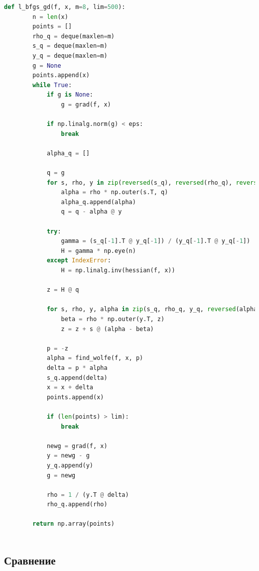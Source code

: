 \documentclass[a4paper,14pt,oneside,openany]{memoir}
\begin{document}
\begin{lstlisting}[language=Python, caption=Реализация L-BFGS]
	def l_bfgs_gd(f, x, m=8, lim=500):
	    n = len(x)
	    points = []
	    rho_q = deque(maxlen=m)
	    s_q = deque(maxlen=m)
	    y_q = deque(maxlen=m)
	    g = None
	    points.append(x)
	    while True:
	        if g is None:
	            g = grad(f, x)
	
	        if np.linalg.norm(g) < eps:
	            break
	
	        alpha_q = []
	
	        q = g
	        for s, rho, y in zip(reversed(s_q), reversed(rho_q), reversed(y_q)):
	            alpha = rho * np.outer(s.T, q)
	            alpha_q.append(alpha)
	            q = q - alpha @ y
	
	        try:
	            gamma = (s_q[-1].T @ y_q[-1]) / (y_q[-1].T @ y_q[-1])
	            H = gamma * np.eye(n)
	        except IndexError:
	            H = np.linalg.inv(hessian(f, x))
	
	        z = H @ q
	
	        for s, rho, y, alpha in zip(s_q, rho_q, y_q, reversed(alpha_q)):
	            beta = rho * np.outer(y.T, z)
	            z = z + s @ (alpha - beta)
	
	        p = -z
	        alpha = find_wolfe(f, x, p)
	        delta = p * alpha
	        s_q.append(delta)
	        x = x + delta
	        points.append(x)
	
	        if (len(points) > lim):
	            break
	
	        newg = grad(f, x)
	        y = newg - g
	        y_q.append(y)
	        g = newg
	
	        rho = 1 / (y.T @ delta)
	        rho_q.append(rho)
	
	    return np.array(points)
	
\end{lstlisting}
    
   
    
	\subsection {Сравнение}
\end{document}
